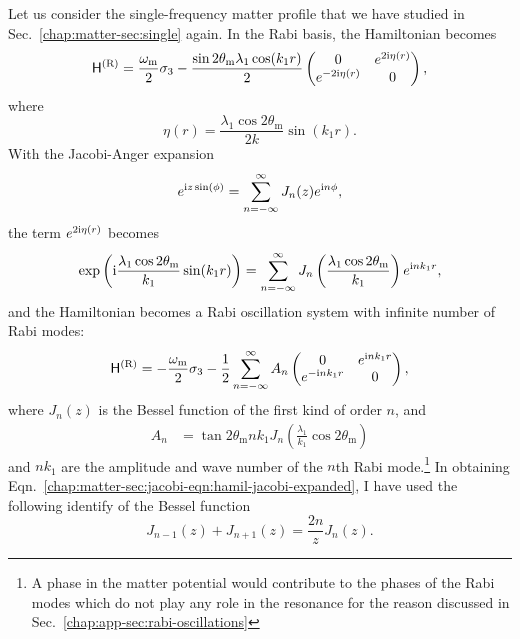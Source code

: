 Let us consider the single-frequency matter profile that we have studied in Sec.~\ref{chap:matter-sec:single} again. In the Rabi basis, the Hamiltonian becomes
\begin{equation}
    \mathsf H^{(\mathrm R)} = \frac{\omega_\mathrm m}{2} \sigma_3 - \frac{\sin 2\theta_\mathrm m \lambda_1\cos (k_1 r)}{2} \begin{pmatrix}
        0 & e^{2\mathrm{i} \eta(r)} \\
        e^{-2\mathrm{i} \eta(r)} & 0
    \end{pmatrix},
\end{equation}
where
\begin{equation}
    \eta(r) =  \frac{\lambda_1 \cos 2\theta_{\mathrm m}}{2 k} \sin (k_1 r) .
\end{equation}
With the Jacobi-Anger expansion
\begin{equation}
e^{\mathrm{i} z \sin (\phi)} = \sum_{n=-\infty}^\infty  J_n(z) e^{\mathrm{i} n\phi},
\end{equation}
the term $e^{2\mathrm{i} \eta(r)}$ becomes
\begin{equation}
    \exp\left({\mathrm{i} \frac{\lambda_1 \cos 2\theta_{\mathrm m}}{k_1} \sin (k_1 r) }\right)  =  \sum_{n=-\infty}^{\infty} J_n \left( \frac{\lambda_1 \cos 2\theta_\mathrm m}{k_1}\right) e^{\mathrm{i} n k_1 r},
\end{equation}
and  the Hamiltonian becomes a Rabi oscillation system with infinite number of Rabi modes:
\begin{equation}
    \mathsf H^{(\mathrm{R})} =
    -\frac{\omega_{\mathrm{m}}}{2} \sigma_3
    -  \frac{1}{2} \sum_{n=-\infty}^\infty A_n \begin{pmatrix}
    0 &  e^{\ri n k_1  r} \\
     e^{ - \ri n k_1 r} & 0
    \end{pmatrix},
    \label{chap:matter-sec:jacobi-eqn:hamil-jacobi-expanded}
\end{equation}
where $J_n(z)$ is the Bessel function of the first kind of order $n$, and
\begin{align}
    A_n &= \tan 2\theta_{\mathrm m} n k_1 J_{n} \left( \frac{\lambda_1}{k_1}\cos 2\theta_{\mathrm m} \right)
\end{align}
and $n k_1$ are the amplitude and wave number of the $n$th Rabi mode.\footnote{A phase in the matter potential would contribute to the phases of the Rabi modes which do not play any role in the resonance for the reason discussed in Sec.~\ref{chap:app-sec:rabi-oscillations}}
In obtaining Eqn.~\ref{chap:matter-sec:jacobi-eqn:hamil-jacobi-expanded}, I have used the following identify of the Bessel function
\begin{equation}
    J_{n-1}(z) + J_{n+1}(z) = \frac{2 n}{z} J_n(z).
    \label{eqn:bessel-function-sum-property}
\end{equation}


